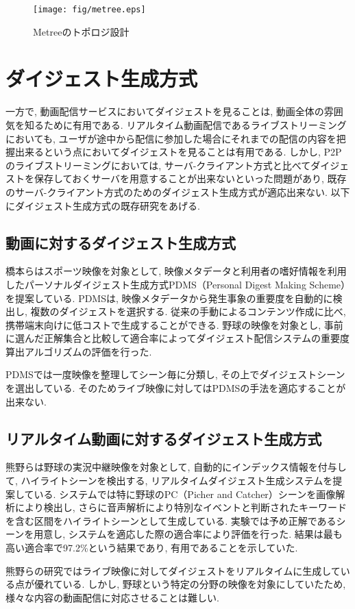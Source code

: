 \begin{figure}
  \centering
  \texttt{[image: fig/metree.eps]}
  \caption{Metreeのトポロジ設計}
  \label{fig:metree}
\end{figure}

\newpage

\section{ダイジェスト生成方式}
一方で, 動画配信サービスにおいてダイジェストを見ることは, 動画全体の雰囲気を知るために有用である. リアルタイム動画配信であるライブストリーミングにおいても, ユーザが途中から配信に参加した場合にそれまでの配信の内容を把握出来るという点においてダイジェストを見ることは有用である. しかし, P2Pのライブストリーミングにおいては, サーバ-クライアント方式と比べてダイジェストを保存しておくサーバを用意することが出来ないといった問題があり, 既存のサーバ-クライアント方式のためのダイジェスト生成方式が適応出来ない. 以下にダイジェスト生成方式の既存研究をあげる.

\subsection{動画に対するダイジェスト生成方式}
橋本らはスポーツ映像を対象として, 映像メタデータと利用者の嗜好情報を利用したパーソナルダイジェスト生成方式PDMS（Personal Digest Making Scheme）\cite{pdms}を提案している. PDMSは, 映像メタデータから発生事象の重要度を自動的に検出し, 複数のダイジェストを選択する. 従来の手動によるコンテンツ作成に比べ, 携帯端末向けに低コストで生成することができる. 野球の映像を対象とし, 事前に選んだ正解集合と比較して適合率によってダイジェスト配信システムの重要度算出アルゴリズムの評価を行った.

PDMSでは一度映像を整理してシーン毎に分類し, その上でダイジェストシーンを選出している. そのためライブ映像に対してはPDMSの手法を適応することが出来ない.

\subsection{リアルタイム動画に対するダイジェスト生成方式}
熊野らは野球の実況中継映像を対象として, 自動的にインデックス情報を付与して, ハイライトシーンを検出する, リアルタイムダイジェスト生成システム\cite{yakyu}を提案している. システムでは特に野球のPC（Picher and Catcher）シーンを画像解析により検出し, さらに音声解析により特別なイベントと判断されたキーワードを含む区間をハイライトシーンとして生成している. 実験では予め正解であるシーンを用意し, システムを適応した際の適合率により評価を行った. 結果は最も高い適合率で97.2\%という結果であり, 有用であることを示していた.

熊野らの研究ではライブ映像に対してダイジェストをリアルタイムに生成している点が優れている. しかし, 野球という特定の分野の映像を対象にしていたため, 様々な内容の動画配信に対応させることは難しい.
